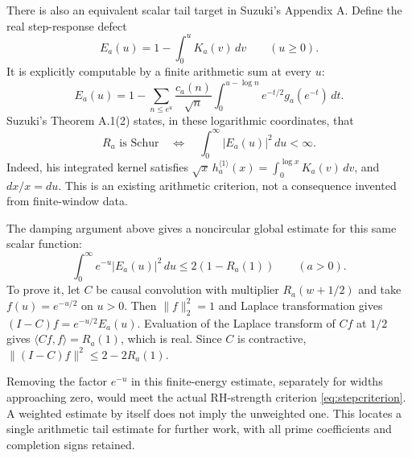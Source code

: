 There is also an equivalent scalar tail target in Suzuki's Appendix A. Define the real step-response defect
\[
 E_a(u)=1-\int_0^u K_a(v)\,dv\qquad(u\geq0).
\]
It is explicitly computable by a finite arithmetic sum at every $u$:
\[
 E_a(u)=1-\sum_{n\leq e^u}\frac{c_a(n)}{\sqrt n}
 \int_0^{u-\log n} e^{-t/2}g_a(e^{-t})\,dt.
\]
Suzuki's Theorem A.1(2) states, in these logarithmic coordinates, that
\begin{equation}\label{eq:stepcriterion}
 R_a\text{ is Schur}\quad\Longleftrightarrow\quad
 \int_0^\infty |E_a(u)|^2\,du<\infty.
\end{equation}
Indeed, his integrated kernel satisfies
$\sqrt{x}\,h_a^{\langle1\rangle}(x)=\int_0^{\log x}K_a(v)\,dv$,
and $dx/x=du$. This is an existing arithmetic criterion, not a consequence invented from finite-window data.

The damping argument above gives a noncircular global estimate for this same scalar function:
\begin{equation}\label{eq:dampedenergy}
 \int_0^\infty e^{-u}|E_a(u)|^2\,du\leq2(1-R_a(1))\qquad(a>0).
\end{equation}
To prove it, let $C$ be causal convolution with multiplier $R_a(w+1/2)$ and take $f(u)=e^{-u/2}$ on $u>0$. Then $\|f\|_2^2=1$ and Laplace transformation gives
$(I-C)f=e^{-u/2}E_a(u)$. Evaluation of the Laplace transform of $Cf$ at $1/2$ gives $\langle Cf,f\rangle=R_a(1)$, which is real. Since $C$ is contractive,
$\|(I-C)f\|^2\leq2-2R_a(1)$.

Removing the factor $e^{-u}$ in this finite-energy estimate, separately for widths approaching zero, would meet the actual RH-strength criterion \eqref{eq:stepcriterion}. A weighted estimate by itself does not imply the unweighted one. This locates a single arithmetic tail estimate for further work, with all prime coefficients and completion signs retained.

